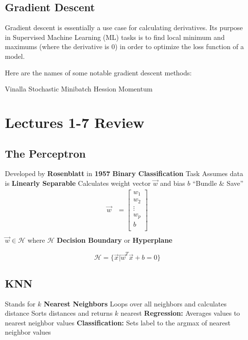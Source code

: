\subsection{Gradient Descent}
Gradient descent is essentially a use case for calculating derivatives. Its purpose in Supervised Machine Learning (ML) tasks is to find local minimum and maximums (where the derivative is 0) in order to optimize the loss function of a model. 

Here are the names of some notable gradient descent methods:
\begin{outline}
    \1 Vinalla
    \1 Stochastic
    \1 Minibatch
    \1 Hession
    \1 Momentum

\end{outline}
\section{Lectures 1-7 Review}

\subsection{The Perceptron}
\begin{outline}
    \1 Developed by \textbf{Rosenblatt} in \textbf{1957}
    \1 \textbf{Binary Classification} Task
    \1 Assumes data is \textbf{Linearly Separable}
    \1 Calculates weight vector $\vec{w}$ and bias $b$ 
    \1 ``Bundle \& Save''   
    \begin{align*}
    \vec{w} &= \begin{bmatrix}
           w_{1}    \\
           w_{2}    \\
           \vdots   \\
           w_{p}    \\
           b        \\
         \end{bmatrix} \\
    \end{align*}
    \1 $\vec{w} \in \mathcal{H}$ where $\mathcal{H}$ \textbf{Decision Boundary} or \textbf{Hyperplane}
\end{outline}

\[
\mathcal{H} = \{\vec{x} | \vec{w}^T\vec{x} + b = 0\}
\]


\subsection{KNN}
\begin{outline}
    \1 Stands for \textbf{$k$ Nearest Neighbors}
    \1 Loops over all neighbors and calculates distance
    \1 Sorts distances and returns $k$ nearest
    \1 \textbf{Regression:} Averages values to nearest neighbor values
    \1 \textbf{Classification:} Sets label to the argmax of nearest neighbor values
\end{outline}


